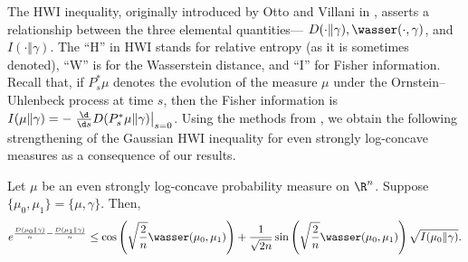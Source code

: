 The HWI inequality, originally introduced by Otto and Villani in \cite{OttoVillani00}, asserts a relationship between the three elemental quantities--- $D(\cdot \Vert \gamma), \wasser(\cdot, \gamma)$, and $I(\cdot \Vert \gamma)$. The ``H'' in HWI stands for relative entropy (as it is sometimes denoted), ``W'' is for the Wasserstein distance, and ``I'' for Fisher information. Recall that, if $P^{\ast}_{s} \mu$ denotes the evolution of the measure $\mu$ under the Ornstein--Uhlenbeck process at time $s$, then the Fisher information is $I(\mu \Vert \gamma) = - \left. \frac{\d}{\d s} D(P^{\ast}_{s} \mu \Vert \gamma) \right|_{s=0}$. Using the methods from \cite{ErbarKuwadaSturm15}, we obtain the following strengthening of the Gaussian HWI inequality for even strongly log-concave measures as a consequence of our results. 
\begin{thm} \label{thm: HWIintro}
    Let $\mu$ be an even strongly log-concave probability measure on $\R^n$. Suppose $\{ \mu_{0}, \mu_{1} \} = \{ \mu , \gamma \}$. Then,
        \begin{equation} \label{eq: HWIintro}
        e^{\frac{D(\mu_{0} \Vert \gamma)}{n} - \frac{D(\mu_{1} \Vert \gamma)}{n}} \leq \cos \left( \sqrt{\frac{2}{n}}\wasser(\mu_{0}, \mu_{1}) \right) + \frac{1}{\sqrt{2n}} \sin \left(  \sqrt{\frac{2}{n}} \wasser(\mu_{0}, \mu_{1}) \right) \sqrt{I(\mu_{0} \Vert \gamma)}.
        \end{equation}
\end{thm}

